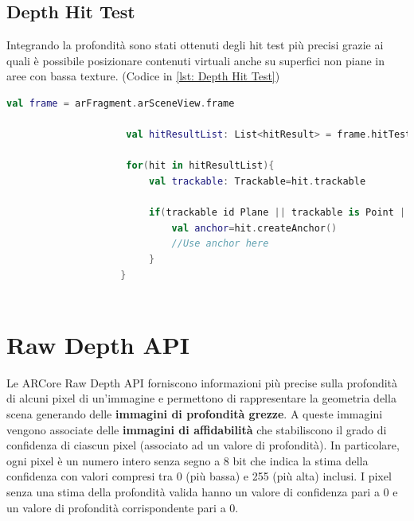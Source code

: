 \documentclass[crop=false, class=book]{standalone}
\begin{document}
		\subsection{Depth Hit Test}
		
		Integrando la profondità sono stati ottenuti degli hit test più precisi grazie ai quali è possibile  							posizionare contenuti virtuali anche su superfici non piane in aree con bassa texture. (Codice in \vref{lst: Depth Hit 			Test})\\

		\begin{center}
				\begin{minipage}{0.95\textwidth}
					\begin{lstlisting}[caption={Depth Hit Test}, label={lst: Depth Hit Test}, language=Kotlin]
					 val frame = arFragment.arSceneView.frame
					
					 val hitResultList: List<hitResult> = frame.hitTest(tap)
					
					 for(hit in hitResultList){
						 val trackable: Trackable=hit.trackable
						
						 if(trackable id Plane || trackable is Point || trackable is DepthPoint){
							 val anchor=hit.createAnchor()
							 //Use anchor here
						 }
					}
					
				\end{lstlisting}
			\end{minipage}
		\end{center}
		
		
		\section{Raw Depth API}
		Le ARCore Raw Depth API forniscono informazioni più precise sulla profondità di alcuni pixel di un'immagine e 					permettono di rappresentare la geometria della scena generando delle \textbf{immagini di profondità grezze}. A 					queste immagini vengono associate delle \textbf{immagini di affidabilità} che stabiliscono il grado di confidenza di 			ciascun pixel (associato ad un valore di profondità). In particolare, ogni pixel è un numero intero senza segno a 8 bit 		che indica la stima della confidenza con valori compresi tra 0 (più bassa) e 255 (più alta) inclusi. I pixel 					senza una stima della profondità valida hanno un valore di confidenza pari a 0 e un valore di profondità 						corrispondente pari a 0.
		
\end{document}
